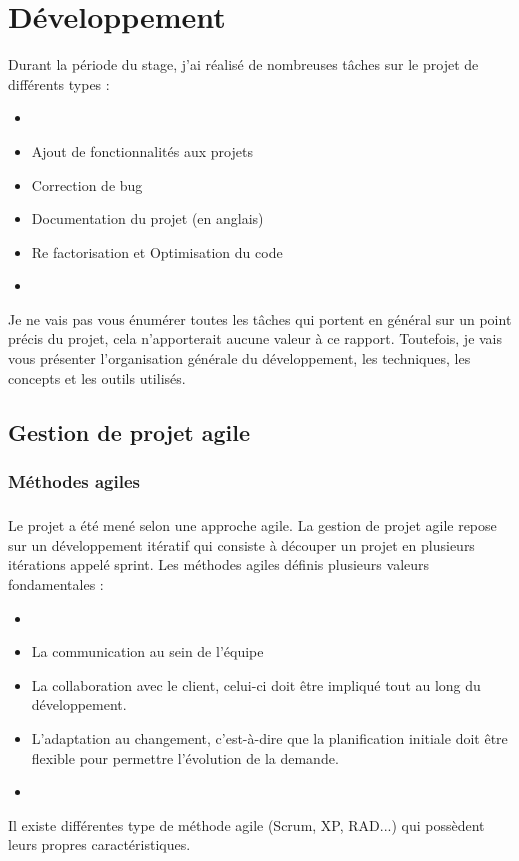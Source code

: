 \chapter{Développement}
Durant la période du stage, j'ai réalisé de nombreuses tâches sur le projet de différents types : 
\begin{itemize}
\item[]
\item Ajout de fonctionnalités aux projets
\item Correction de bug
\item Documentation du projet (en anglais)
\item Re factorisation et Optimisation du code
\item[]
\end{itemize}

Je ne vais pas vous énumérer toutes les tâches qui portent en général sur un point précis du projet,  cela n'apporterait aucune valeur à ce rapport. Toutefois, je vais vous présenter l'organisation générale du développement, les techniques, les concepts et les outils utilisés.

\section{Gestion de projet agile}
\subsection{Méthodes agiles}
\paragraph{}
Le projet a été mené selon une approche agile. La gestion de projet agile repose sur un développement itératif qui consiste à découper un projet en plusieurs itérations appelé sprint. Les méthodes agiles définis plusieurs valeurs fondamentales : 

\begin{itemize}
         \item[]
\item La communication au sein de l'équipe
\item La collaboration avec le client, celui-ci doit être impliqué tout au long du développement.
\item L'adaptation au changement, c'est-à-dire que la planification initiale doit être flexible pour permettre l'évolution de la demande. 
         \item[]
\end{itemize}
Il existe différentes type de méthode agile (Scrum, XP, RAD...) qui possèdent leurs propres caractéristiques.

